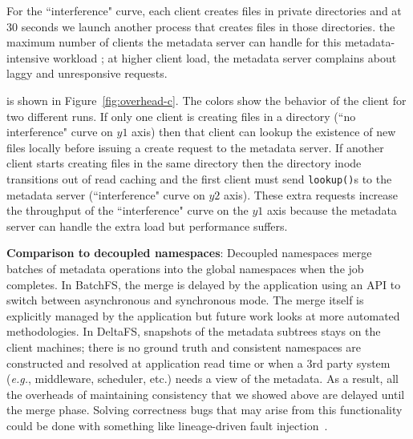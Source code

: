  For the ``interference"
curve, each client creates files in private directories and at 30 seconds we
launch another process that creates files in those directories.  the maximum number of
clients the metadata server can handle for this metadata-intensive workload
; at higher client load, the metadata server
complains about laggy and unresponsive requests.

 is shown in
Figure~\ref{fig:overhead-c}. The colors show the behavior of the client for two
different runs.  If only one client is creating files in a directory
(``no interference" curve on \(y1\) axis) then that client can lookup the existence of
new files locally before issuing a create request to the metadata server. If
another client starts creating files in the same directory then the directory
inode transitions out of read caching and the first client must send
\texttt{lookup()}s to the metadata server (``interference" curve on \(y2\) axis).
These extra requests increase the throughput of the ``interference" curve on the
\(y1\) axis because the metadata server can handle the extra load but
performance suffers.  




\textbf{Comparison to decoupled namespaces}: Decoupled namespaces merge batches
of metadata operations into the global namespaces when the job completes.  In
BatchFS, the merge is delayed by the application using an API to switch between
asynchronous and synchronous mode. The merge itself is explicitly managed by
the application but future work looks at more automated methodologies. In
DeltaFS, snapshots of the metadata subtrees stays on the client machines; there
is no ground truth and consistent namespaces are constructed and resolved at
application read time or when a 3rd party system ({\it e.g.}, middleware,
scheduler, etc.) needs a view of the metadata. As a result, all the overheads
of maintaining consistency that we showed above are delayed until the merge
phase. Solving correctness bugs that may arise from this functionality could be
done with something like lineage-driven fault
injection~\cite{alvaro:sigmod15-ldfi}.
